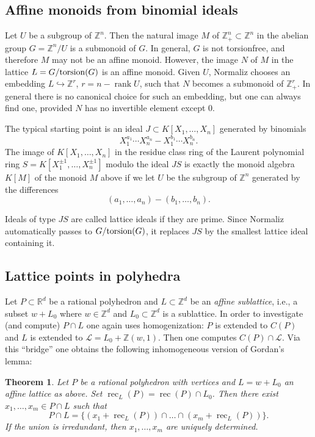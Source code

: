 \documentclass[12pt,a4paper]{scrartcl}
\newtheorem{theorem}{Theorem}
\theoremstyle{definition}
\def\ZZ{{\mathbb Z}}
\def\RR{{\mathbb R}}
\def\cL{{\mathcal L}}
\DeclareMathOperator{\rank}{rank}
\DeclareMathOperator{\rec}{rec}
\begin{document}
\subsection{Affine monoids from binomial ideals}\label{binomials}

Let $U$ be a subgroup of $\ZZ^n$. Then the natural image $M$ of
$\ZZ_+^n\subset\ZZ^n$ in the abelian group $G=\ZZ^n/U$ is a
submonoid of $G$. In general, $G$ is not torsionfree, and
therefore $M$ may not be an affine monoid. However, the image
$N$ of $M$ in the lattice $L=G/\textup{torsion}(G)$ is an affine
monoid. Given $U$, Normaliz chooses an embedding
$L\hookrightarrow\ZZ^r$, $r=n-\rank U$, such that $N$ becomes a
submonoid of $\ZZ_+^r$. In general there is no canonical choice
for such an embedding, but one can always find one, provided
$N$ has no invertible element except $0$. 

The typical starting point is an ideal $J\subset
K[X_1,\dots,X_n]$ generated by binomials
$$
X_1^{a_1}\cdots X_n^{a_n}-X_1^{b_1}\cdots X_n^{b_n}.
$$
The image of $K[X_1,\dots,X_n]$ in the residue class ring of
the Laurent polynomial ring $S=K[X_1^{\pm1},\dots,X_n^{\pm1}]$
modulo the ideal $JS$ is exactly the monoid algebra $K[M]$ of
the monoid $M$ above if we let $U$ be the subgroup of $\ZZ^n$
generated by the differences
$$
(a_1,\dots,a_n)-(b_1,\dots,b_n).
$$

Ideals of type $JS$ are called lattice ideals if they are
prime. Since Normaliz automatically passes to
$G/\textup{torsion}(G)$, it replaces $JS$ by the smallest lattice
ideal containing it.

\subsection{Lattice points in polyhedra}\label{latt_hedra}

Let $P\subset \RR^d$ be a rational polyhedron and $L\subset \ZZ^d$ be an \emph{affine sublattice}, i.e., a subset $w+L_0$ where $w\in\ZZ^d$ and $L_0\subset \ZZ^d$ is a sublattice. In order to investigate (and compute) $P\cap L$ one again uses homogenization: $P$ is extended to $C(P)$ and $L$ is extended to $\cL=L_0+\ZZ(w,1)$. Then one computes $C(P)\cap \cL$. Via this ``bridge'' one obtains the following inhomogeneous version of Gordan's lemma:

\begin{theorem}
	Let $P$ be a rational polyhedron with vertices and $L=w+L_0$ an affine lattice as above. Set $\rec_L(P)=\rec(P)\cap L_0$. Then there exist $x_1,\dots,x_m\in P\cap L$ such that
	$$
	P\cap L=\{(x_1+\rec_L(P))\cap\dots\cap(x_m+\rec_L(P))\}.
	$$
	If the union is irredundant, then $x_1,\dots,x_m$ are uniquely determined.
\end{theorem}
\end{document}
